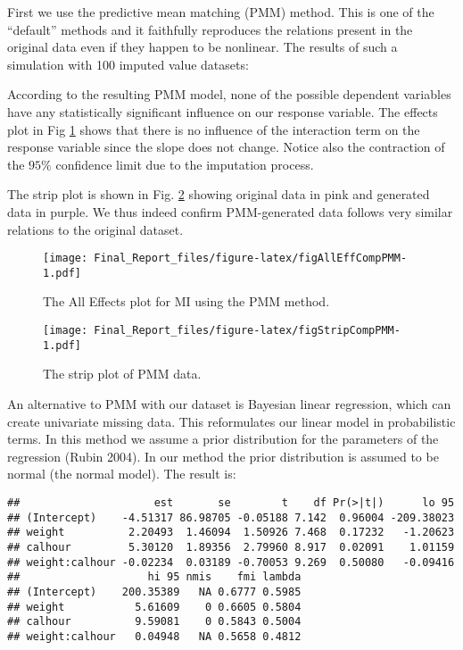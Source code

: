\documentclass[]{article}
\theoremstyle{definition}
\theoremstyle{definition}
\theoremstyle{definition}
\theoremstyle{remark}
\begin{document}
First we use the predictive mean matching (PMM) method. This is one of
the ``default'' methods and it faithfully reproduces the relations
present in the original data even if they happen to be nonlinear. The
results of such a simulation with 100 imputed value datasets:

According to the resulting PMM model, none of the possible dependent
variables have any statistically significant influence on our response
variable. The effects plot in Fig \ref{fig:AllEffGoodModel} shows that
there is no influence of the interaction term on the response variable
since the slope does not change. Notice also the contraction of the
\(95\%\) confidence limit due to the imputation process.

The strip plot is shown in Fig. \ref{fig:StripCompPMM} showing original
data in pink and generated data in purple. We thus indeed confirm
PMM-generated data follows very similar relations to the original
dataset.

\begin{figure}[htbp]
\centering
\texttt{[image: Final\_Report\_files/figure-latex/figAllEffCompPMM-1.pdf]}
\caption{\label{fig:figAllEffCompPMM}\label{fig:AllEffGoodModel}The All
Effects plot for MI using the PMM method.}
\end{figure}

\begin{figure}[htbp]
\centering
\texttt{[image: Final\_Report\_files/figure-latex/figStripCompPMM-1.pdf]}
\caption{\label{fig:figStripCompPMM}\label{fig:StripCompPMM}The strip plot
of PMM data.}
\end{figure}

An alternative to PMM with our dataset is Bayesian linear regression,
which can create univariate missing data. This reformulates our linear
model in probabilistic terms. In this method we assume a prior
distribution for the parameters of the regression (Rubin 2004). In our
method the prior distribution is assumed to be normal (the normal
model). The result is:

\begin{verbatim}
##                     est       se        t    df Pr(>|t|)      lo 95
## (Intercept)    -4.51317 86.98705 -0.05188 7.142  0.96004 -209.38023
## weight          2.20493  1.46094  1.50926 7.468  0.17232   -1.20623
## calhour         5.30120  1.89356  2.79960 8.917  0.02091    1.01159
## weight:calhour -0.02234  0.03189 -0.70053 9.269  0.50080   -0.09416
##                    hi 95 nmis    fmi lambda
## (Intercept)    200.35389   NA 0.6777 0.5985
## weight           5.61609    0 0.6605 0.5804
## calhour          9.59081    0 0.5843 0.5004
## weight:calhour   0.04948   NA 0.5658 0.4812
\end{verbatim}
\end{document}
